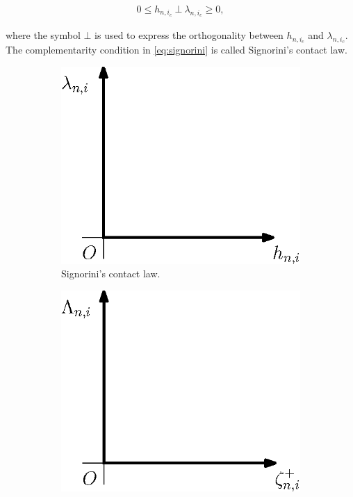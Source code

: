 \documentclass[../DC2017114Bouma.tex]{subfiles}
\begin{document}
\begin{align}
0\leq h_{n,i_c}\ \bot\ \lambda_{n,i_c} \geq 0,\label{eq:signorini}
\end{align}

where the symbol $\bot$ is used to express the orthogonality between $h_{n,i_c}$ and $\lambda_{n,i_c}$. The complementarity condition in \eqref{eq:signorini} is called Signorini's contact law.
\begin{figure}[h]
\centering
\begin{subfigure}{0.3\textwidth}
\centering
\includegraphics[width=\linewidth]{signorinicontact.eps}
\caption{Signorini's contact law.}\label{fig:signorinicontact}
\end{subfigure}
\qquad
\begin{subfigure}{0.3\textwidth}
\centering
\includegraphics[width=\linewidth]{poissonimpact.eps}

\end{subfigure}
\end{figure}
\end{document}
